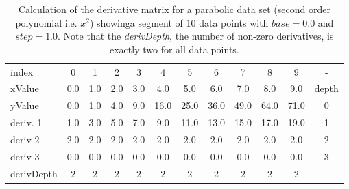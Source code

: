 \documentclass[main.tex]{subfiles}
\begin{document}
  
  \begin{table}[h]
    \caption{Calculation of the derivative matrix for a parabolic data set (second order polynomial i.e. $x^2$) showinga segment of 10 data points with $base=0.0$ and $step=1.0$. Note that the \textit{derivDepth}, the number of non-zero derivatives, is exactly two for all data points.}
    \centering
    \begin{tabularx}{0.95\textwidth}{ X | c c c c c c c c c c || c }
      index & 0 & 1 & 2 & 3 & 4 & 5 & 6 & 7 & 8 & 9 &  -\\
      xValue & 0.0 & 1.0 & 2.0 & 3.0 & 4.0 & 5.0 & 6.0 & 7.0 & 8.0 & 9.0 & depth\\
      \hline \hline
      yValue & 0.0 & 1.0 & 4.0 & 9.0 & 16.0 & 25.0 & 36.0 &  49.0 & 64.0 & 71.0 & 0 \\
      \hline
      deriv. 1 & 1.0 & 3.0 & 5.0 & 7.0 & 9.0 & 11.0 & 13.0 & 15.0 & 17.0 & 19.0 & 1\\
      deriv 2 & 2.0 & 2.0 & 2.0 & 2.0 & 2.0 & 2.0 & 2.0 & 2.0 & 2.0 & 2.0 & 2\\
      deriv 3 & 0.0 & 0.0 & 0.0 & 0.0 & 0.0 & 0.0 & 0.0 & 0.0 & 0.0 & 0.0 & 3\\   
      \hline
      derivDepth & 2 & 2 & 2 & 2 & 2 & 2 & 2 & 2 & 2 & 2 & - \\   
    \end{tabularx}
    \label{tbl:mtrx:simple}
  \end{table}
  
\end{document}

